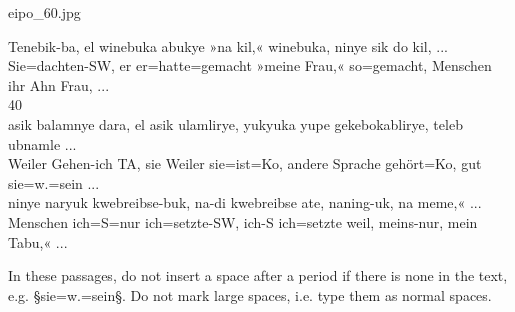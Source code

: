 \documentclass[fontsize=11pt, paper=a4, 
DIV15,
normalheadings,
parskip=half-, 
pointlessnumbers]{scrartcl}
\begin{document}
\vspace{5mm}
\begin{sampleImage}[: 0060.jpg]{eipo_60.jpg}

\vspace{-3mm}
\begin{typeLatin}
\xs{}Tenebik-ba, el winebuka abukye »na kil,« winebuka, ninye sik do kil, ...  \\
\xs{}Sie=dachten-SW, er er=hatte=gemacht »meine Frau,« so=gemacht, Menschen ihr Ahn Frau, ...  \\
\xs{}40 \\
\xs{}asik balamnye dara, el asik ulamlirye, yukyuka yupe gekebokablirye, teleb ubnamle ...  \\
\xs{}Weiler Gehen-ich TA, sie Weiler sie=ist=Ko, andere Sprache gehört=Ko, gut sie=w.=sein ...  \\
\xs{}ninye naryuk kwebreibse-buk, na-di kwebreibse ate, naning-uk, na meme,« ...  \\
\xs{}Menschen ich=S=nur ich=setzte-SW, ich-S ich=setzte weil, meins-nur, mein Tabu,« ...  \\
\end{typeLatin}


\end{sampleImage}

\begin{note}
In these passages, do not insert a space after a period if there is none in the text, e.g. §sie=w.=sein§. Do not mark large spaces, i.e. type them as normal spaces.
\end{note}
\end{document}
